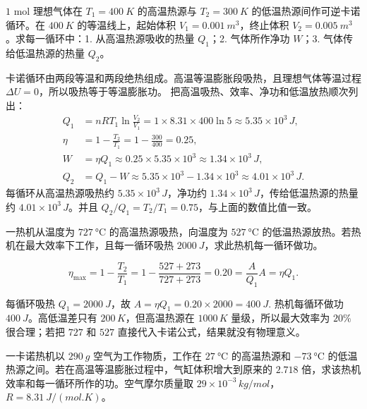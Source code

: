 \documentclass[lang=cn,11pt]{elegantbook}
\begin{document}
\begin{exercise}
\(1\) mol 理想气体在 \(T_1=\SI{400}{K}\) 的高温热源与 \(T_2=\SI{300}{K}\) 的低温热源间作可逆卡诺循环。在 \(\SI{400}{K}\) 的等温线上，起始体积 \(V_1=\SI{0.001}{m^3}\)，终止体积 \(V_2=\SI{0.005}{m^3}\)。求每一循环中：1. 从高温热源吸收的热量 \(Q_1\)；2. 气体所作净功 \(W\)；3. 气体传给低温热源的热量 \(Q_2\)。
\end{exercise}

\begin{solution}
卡诺循环由两段等温和两段绝热组成。高温等温膨胀段吸热，且理想气体等温过程 \(\Delta U=0\)，所以吸热等于等温膨胀功。
把高温吸热、效率、净功和低温放热顺次列出：
\[
\begin{aligned}
Q_1&=nRT_1\ln\frac{V_2}{V_1}
=1\times8.31\times400\ln5
\approx 5.35\times10^3\,\si{J},\\
\eta&=1-\frac{T_2}{T_1}
=1-\frac{300}{400}
=0.25,\\
W&=\eta Q_1
\approx0.25\times5.35\times10^3
\approx1.34\times10^3\,\si{J},\\
Q_2&=Q_1-W
\approx 5.35\times10^3-1.34\times10^3
\approx4.01\times10^3\,\si{J}.
\end{aligned}
\]
每循环从高温热源吸热约 \(5.35\times10^3\,\si{J}\)，净功约 \(1.34\times10^3\,\si{J}\)，传给低温热源的热量约 \(4.01\times10^3\,\si{J}\)。并且 \(Q_2/Q_1=T_2/T_1=0.75\)，与上面的数值比值一致。
\end{solution}

\begin{exercise}
一热机从温度为 \(\SI{727}{\celsius}\) 的高温热源吸热，向温度为 \(\SI{527}{\celsius}\) 的低温热源放热。若热机在最大效率下工作，且每一循环吸热 \(\SI{2000}{J}\)，求此热机每一循环做功。
\end{exercise}

\begin{solution}
 \[\eta_{\max}=1-\frac{T_2}{T_1}=1-\frac{527+273}{727+273}=0.20=\frac{A}{Q_1}A=\eta Q_1.\]


每循环吸热 \(Q_1=\SI{2000}{J}\)，故
 \(A=\eta Q_1=0.20\times2000=\SI{400}{J}.\) 
热机每循环做功 \(\SI{400}{J}\)。高低温差只有 \(200\,\si{K}\)，但高温热源在 \(1000\,\si{K}\) 量级，所以最大效率为 \(20\%\) 很合理；若把 \(727\) 和 \(527\) 直接代入卡诺公式，结果就没有物理意义。
\end{solution}

\begin{exercise}
一卡诺热机以 \(\SI{290}{g}\) 空气为工作物质，工作在 \(\SI{27}{\celsius}\) 的高温热源和 \(\SI{-73}{\celsius}\) 的低温热源之间。若在高温等温膨胀过程中，气缸体积增大到原来的 \(2.718\) 倍，求该热机效率和每一循环所作的功。空气摩尔质量取 \(29\times10^{-3}\,\si{kg/mol}\)，\(R=\SI{8.31}{J/(mol.K)}\)。
\end{exercise}
\end{document}
